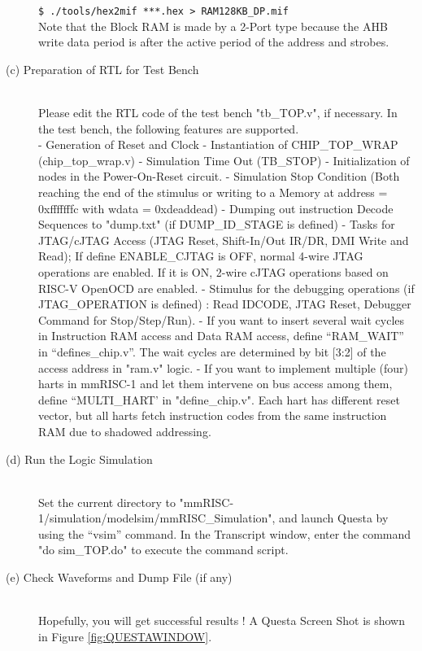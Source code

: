 \begin{description}
\texttt{\$ ./tools/hex2mif ***.hex >  RAM128KB\_DP.mif}\\

Note that the Block RAM is made by a 2-Port type because the AHB write data period is after the active period of the address and strobes.

    \item[(c) Preparation of RTL for Test Bench]\mbox{} \\
Please edit the RTL code of the test bench "tb\_TOP.v", if necessary. In the test bench, the following features are supported.\\

- Generation of Reset and Clock
- Instantiation of CHIP\_TOP\_WRAP (chip\_top\_wrap.v)
- Simulation Time Out (\textasciigrave TB\_STOP)
- Initialization of nodes in the Power-On-Reset circuit.
- Simulation Stop Condition (Both reaching the end of the stimulus or writing to a Memory at address = 0xfffffffc with wdata = 0xdeaddead)
- Dumping out instruction Decode Sequences to "dump.txt" (if \textasciigrave DUMP\_ID\_STAGE is defined)
- Tasks for JTAG/cJTAG  Access (JTAG Reset, Shift-In/Out IR/DR, DMI Write and Read); If \textasciigrave define ENABLE\_CJTAG is OFF, normal 4-wire JTAG operations are enabled. If it is ON, 2-wire cJTAG operations based on RISC-V OpenOCD are enabled. 
- Stimulus for the debugging operations (if \textasciigrave JTAG\_OPERATION is defined) : Read IDCODE, JTAG Reset, Debugger Command for Stop/Step/Run). 
- If you want to insert several wait cycles in Instruction RAM access and Data RAM access, define “\textasciigrave RAM\_WAIT” in “defines\_chip.v”. The wait cycles are determined by bit [3:2] of the access address in "ram.v" logic.
- If you want to implement multiple (four) harts in mmRISC-1 and let them intervene on bus access among them, define “\textasciigrave MULTI\_HART’ in "define\_chip.v". Each hart has different reset vector, but all harts fetch instruction codes from the same instruction RAM due to shadowed addressing.

    \item[(d) Run the Logic Simulation]\mbox{} \\
Set the current directory to "mmRISC-1/simulation/modelsim/mmRISC\_Simulation", and launch Questa by using the “vsim” command. In the Transcript window, enter the command "do sim\_TOP.do" to execute the command script.

    \item[(e) Check Waveforms and Dump File (if any)]\mbox{} \\
Hopefully, you will get successful results ! A Questa Screen Shot is shown in Figure \ref{fig:QUESTAWINDOW}.

\end{description}

